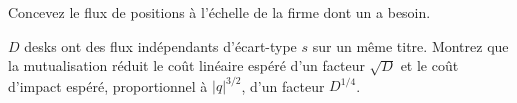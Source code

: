\begin{interviewq}\label{iq:s2:the-central-risk-book:5}
Concevez le flux de positions à l'échelle de la firme dont un  a besoin.
\end{interviewq}

\begin{interviewq}\label{iq:s2:the-central-risk-book:6}
$D$ desks ont des flux indépendants d'écart-type $s$ sur un même titre. Montrez que la mutualisation réduit le coût linéaire espéré d'un facteur $\sqrt D$ et
le coût d'impact espéré, proportionnel à $|q|^{3/2}$, d'un facteur $D^{1/4}$.
\end{interviewq}
